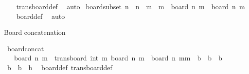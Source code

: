 \begin{isabellebody}
%
\isadelimproof
\ \ %
\endisadelimproof
%
\isatagproof
{}\isamarkupfalse%
\ trans{\isacharunderscore}{\kern0pt}board{\isacharunderscore}{\kern0pt}def\ \isamarkupfalse%
\ auto%
\endisatagproof
{\isafoldproof}%
%
\isadelimproof
\isanewline
%
\endisadelimproof
\isanewline
{}\isamarkupfalse%
\ board{\isacharunderscore}{\kern0pt}subset{\isacharcolon}{\kern0pt}\ {\isachardoublequoteopen}n\ {\isasymle}\ n\ {\isasymLongrightarrow}\ m\ {\isasymle}\ m\ {\isasymLongrightarrow}\ board\ n\ m\ {\isasymsubseteq}\ board\ n\ m\isanewline
%
\isadelimproof
\ \ %
\endisadelimproof
%
\isatagproof
{}\isamarkupfalse%
\ board{\isacharunderscore}{\kern0pt}def\ \isamarkupfalse%
\ auto%
\endisatagproof
{\isafoldproof}%
%
\isadelimproof
%
\endisadelimproof
%
\begin{isamarkuptext}%
Board concatenation%
\end{isamarkuptext}\isamarkuptrue%
\isamarkupfalse%
\ board{\isacharunderscore}{\kern0pt}concat{\isacharcolon}{\kern0pt}\ \isanewline
\ \ \ {\isachardoublequoteopen}board\ n\ m\ {\isasymunion}\ trans{\isacharunderscore}{\kern0pt}board\ {\isacharparenleft}{\kern0pt}{}{\isacharcomma}{\kern0pt}int\ m\ {\isacharparenleft}{\kern0pt}board\ n\ m\ {\isacharequal}{\kern0pt}\ board\ n\ {\isacharparenleft}{\kern0pt}mm\ {\isacharparenleft}{\kern0pt}\ {\isachardoublequoteopen}{\isacharquery}{\kern0pt}b{}\ {\isasymunion}\ {\isacharquery}{\kern0pt}b{}\ {\isacharequal}{\kern0pt}\ {\isacharquery}{\kern0pt}b{\isachardoublequoteclose}{\isacharparenright}{\kern0pt}\isanewline
%
\isadelimproof
%
\endisadelimproof
%
\isatagproof
{}\isamarkupfalse%
\isanewline
\ \ \isamarkupfalse%
\ {\isachardoublequoteopen}{\isacharquery}{\kern0pt}b{}\ {\isasymunion}\ {\isacharquery}{\kern0pt}b{}\ {\isasymsubseteq}\ {\isacharquery}{\kern0pt}b{\isachardoublequoteclose}\ \isamarkupfalse%
\ board{\isacharunderscore}{\kern0pt}def\ trans{\isacharunderscore}{\kern0pt}board{\isacharunderscore}{\kern0pt}def\ \isamarkupfalse%

\end{isabellebody}
